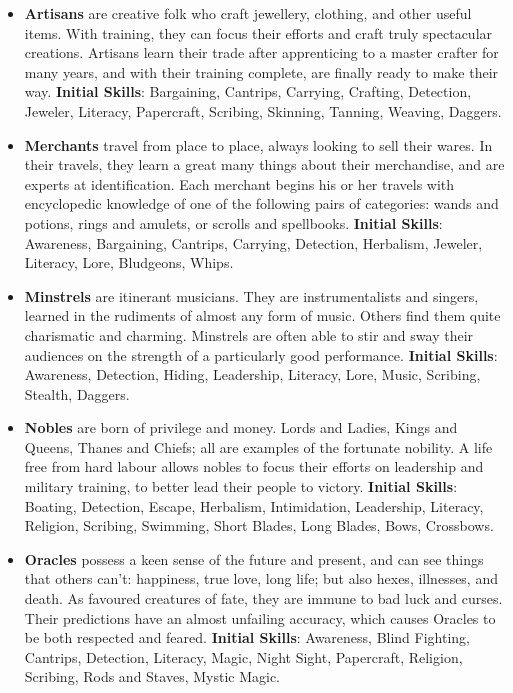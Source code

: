 \begin{itemize}
\item {\bf Artisans} are creative folk who craft jewellery, clothing, and 
other useful items.  With training, they can focus their efforts and craft 
truly spectacular creations.  Artisans learn their trade after apprenticing
to a master crafter for many years, and with their training complete, are
finally ready to make their way.  \textbf{Initial Skills}: Bargaining,
Cantrips, Carrying, Crafting, Detection, Jeweler, Literacy, Papercraft, 
Scribing, Skinning, Tanning, Weaving, Daggers.

\item {\bf Merchants} travel from place to place, always looking to sell 
their wares.  In their travels, they learn a great many things about their 
merchandise, and are experts at identification.  Each merchant begins his 
or her travels with encyclopedic knowledge of one of the following pairs
of categories: wands and potions, rings and amulets, or scrolls and 
spellbooks.
\textbf{Initial Skills}: Awareness, Bargaining, Cantrips, Carrying,
Detection, Herbalism, Jeweler, Literacy, Lore, Bludgeons, Whips.

\item {\bf Minstrels} are itinerant musicians.  They are instrumentalists 
and singers, learned in the rudiments of almost any form of music.  Others 
find them quite charismatic and charming.  Minstrels are often able to stir
and sway their audiences on the strength of a particularly good performance.
\textbf{Initial Skills}: Awareness, Detection, Hiding, Leadership, 
Literacy, Lore, Music, Scribing, Stealth, Daggers.

\item {\bf Nobles} are born of privilege and money.  Lords and Ladies, 
Kings and Queens, Thanes and Chiefs; all are examples of the fortunate 
nobility.  A life free from hard labour allows nobles to focus their 
efforts on leadership and military training, to better lead their people 
to victory.  \textbf{Initial Skills}: Boating, Detection, Escape, 
Herbalism, Intimidation, Leadership, Literacy, Religion, Scribing,
Swimming, Short Blades, Long Blades, Bows, Crossbows.

\item {\bf Oracles} possess a keen sense of the future and present, and can
see things that others can't: happiness, true love, long life; but also 
hexes, illnesses, and death.  As favoured creatures of fate, they are 
immune to bad luck and curses.  Their predictions have an almost unfailing 
accuracy, which causes Oracles to be both respected and feared.
\textbf{Initial Skills}: Awareness, Blind Fighting, Cantrips, Detection,
Literacy, Magic, Night Sight, Papercraft, Religion, Scribing, Rods and
Staves, Mystic Magic.


\end{itemize}
